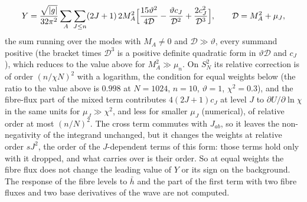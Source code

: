 \[
Y=\frac{\sqrt{|g|}}{32\pi^2}\sum_A\sum_{J\le n}(2J+1)\,2M_A^2\Bigl[\frac{15\vartheta^2}{4\mathcal D}-\frac{\vartheta c_J}{\mathcal D^2}+\frac{2c_J^2}{\mathcal D^3}\Bigr],\qquad\mathcal D=M_A^2+\mu_J,
\]
the sum running over the modes with \(M_A\ne0\) and \(\mathcal D\gg\vartheta\), every summand positive (the bracket times \(\mathcal D^3\) is a positive definite quadratic form in \(\vartheta\mathcal D\) and \(c_J\)), which reduces to the value above for \(M_A^2\gg\mu_n\). On \(S^2_N\) its relative correction is of order \((n/\chi N)^2\) with a logarithm, the condition for equal weights below (the ratio to the value above is \(0.998\) at \(N=1024\), \(n=10\), \(\vartheta=1\), \(\chi^2=0.3\)), and the fibre-flux part of the mixed term contributes \(4(2J+1)c_J\) at level \(J\) to \(\partial U/\partial\ln\chi\) in the same units for \(\mu_J\gg\chi^2\), and less for smaller \(\mu_J\) (numerical), of relative order at most \((n/N)^2\). The cross term commutes with \(J_{ab}\), so it leaves the non-negativity of the integrand unchanged, but it changes the weights at relative order \(sJ^2\), the order of the \(J\)-dependent terms of this form: those terms hold only with it dropped, and what carries over is their order. So at equal weights the fibre flux does not change the leading value of \(Y\) or its sign on the background. The response of the fibre levels to \(\bar h\) and the part of the first term with two fibre fluxes and two base derivatives of the wave are not computed.


